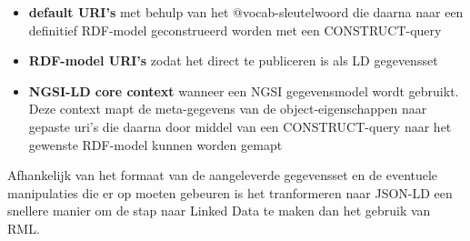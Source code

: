 \begin{itemize}
    \item \textbf{default URI's} met behulp van het @vocab-sleutelwoord die daarna naar een definitief RDF-model geconstrueerd worden met een CONSTRUCT-query
    \item \textbf{RDF-model URI's} zodat het direct te publiceren is als LD gegevensset
    \item \textbf{NGSI-LD core context} wanneer een NGSI gegevensmodel wordt gebruikt. Deze context mapt de meta-gegevens van de object-eigenschappen naar gepaste uri's die daarna door middel van een CONSTRUCT-query naar het gewenste RDF-model kunnen worden gemapt
\end{itemize}

Afhankelijk van het formaat van de aangeleverde gegevensset en de eventuele manipulaties die er op moeten gebeuren is het tranformeren naar JSON-LD een snellere manier om de stap naar Linked Data te maken dan het gebruik van RML.